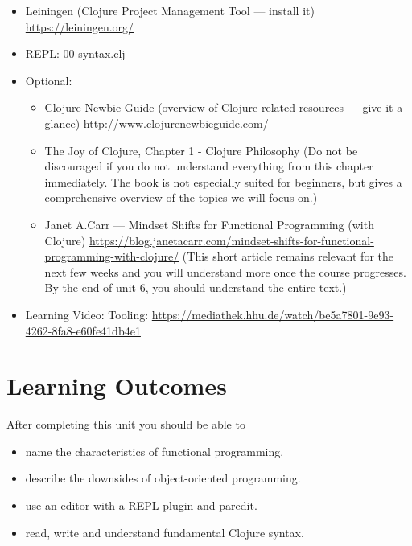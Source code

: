 \documentclass[11pt,a4paper]{article}
\begin{document}
	\begin{itemize}
        \item Leiningen (Clojure Project Management Tool --- install it) \url{https://leiningen.org/}
        \item REPL: 00-syntax.clj
        \item Optional:
            \begin{itemize}
                \item Clojure Newbie Guide (overview of Clojure-related resources --- give it a glance) \url{http://www.clojurenewbieguide.com/}
                \item The Joy of Clojure, Chapter 1 - Clojure Philosophy 
                    (Do not be discouraged if you do not understand everything from this chapter immediately.
                    The book is not especially suited for beginners, but gives a comprehensive overview of the topics we will focus on.)
                \item Janet A.\@ Carr --- Mindset Shifts for Functional Programming (with Clojure) \url{https://blog.janetacarr.com/mindset-shifts-for-functional-programming-with-clojure/}
                    (This short article remains relevant for the next few weeks and you will understand more once the course progresses. By the end of unit 6, you should understand the entire text.)
            \end{itemize}
        \item Learning Video: Tooling: \url{https://mediathek.hhu.de/watch/be5a7801-9e93-4262-8fa8-e60fe41db4e1}
	\end{itemize}
	
	
	\section{Learning Outcomes}
	
	After completing this unit you should be able to
	
	\begin{itemize}
		\item name the characteristics of functional programming.
		\item describe the downsides of object-oriented programming.
		\item use an editor with a REPL-plugin and paredit.
        \item read, write and understand fundamental Clojure syntax.
	\end{itemize}
	
\end{document}
